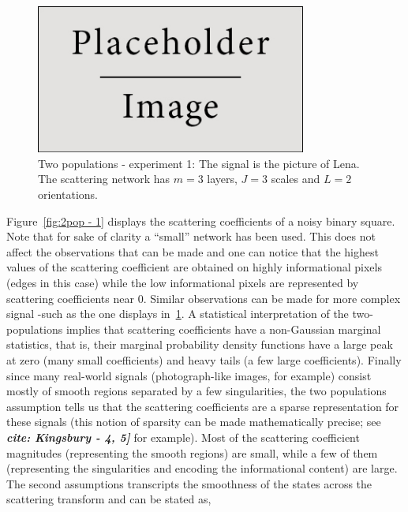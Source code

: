 \documentclass[a4paper,11pt]{report}
\begin{document}
		\begin{figure}
				\begin{center}
					\includegraphics[width=3.5in]{placeholder.jpg}
					\caption[Two populations - experiment 2.]{Two populations - experiment 1: The signal is the picture of Lena. The scattering network has $m=3$ layers, $J=3$ scales and $L=2$ orientations.} %
					\label{fig:2pop - 2}
				\end{center}
		\end{figure}
		
		Figure~\ref{fig:2pop - 1} displays the scattering coefficients of a noisy binary square. Note that for sake of clarity a ``small'' network has been used. This does not affect the observations that can be made and one can notice that the highest values of the scattering coefficient are obtained on highly informational pixels (edges in this case) while the low informational pixels are represented by scattering coefficients near $0$. Similar observations can be made for more complex signal -such as the one displays in~\ref{fig:2pop - 2}. A statistical interpretation of the two-populations implies that scattering coefficients have a non-Gaussian marginal statistics, that is, their marginal probability density functions have a large peak at zero (many small coefficients) and heavy tails (a few large coefficients). Finally since many real-world signals (photograph-like images, for example) consist mostly of smooth regions separated by a few singularities, the two populations assumption tells us that the scattering coefficients are a sparse representation for these signals (this notion of sparsity can be made mathematically precise; see \textbf{\textit{cite: Kingsbury - 4, 5]}} for example). Most of the scattering coefficient magnitudes (representing the smooth regions) are small, while a few of them (representing the singularities and encoding the informational content) are large.\\
		
		The second assumptions transcripts the smoothness of the states across the scattering transform and can be stated as,\\
		
\end{document}
